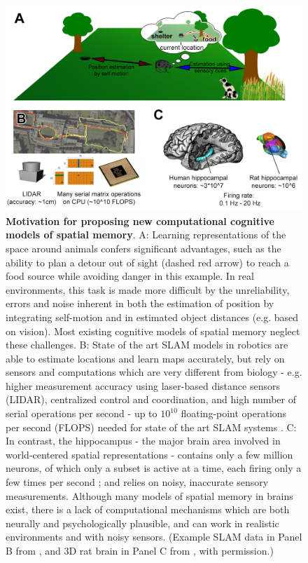 \begin{figure}[h]
	\centering
	\includegraphics[width=\textwidth]{img/motivation}
	\caption[Motivation for proposing new computational cognitive models of spatial memory]{\textbf{Motivation for proposing new computational cognitive models of spatial memory}. A: Learning representations of the space around animals confers significant advantages, such as the ability to plan a detour out of sight (dashed red arrow) to reach a food source while avoiding danger in this example. In real environments, this task is made more difficult by the unreliability, errors and noise inherent in both the estimation of position by integrating self-motion and in estimated object distances (e.g. based on vision). Most existing cognitive models of spatial memory neglect these challenges. B: State of the art SLAM models in robotics are able to estimate locations and learn maps accurately, but rely on sensors and computations which are very different from biology - e.g. higher measurement accuracy using laser-based distance sensors (LIDAR), centralized control and coordination, and high number of serial operations per second - up to $10^{10}$ floating-point operations per second (FLOPS) needed for state of the art SLAM systems \citep{machado2013evaluation}. C: In contrast, the hippocampus - the major brain area involved in world-centered spatial representations - contains only a few million neurons, of which only a subset is active at a time, each firing only a few times per second \citep{rapp1996preserved,vsimic1997volume}; and relies on noisy, inaccurate sensory measurements. Although many models of spatial memory in brains exist, there is a lack of computational mechanisms which are both neurally and psychologically plausible, and can work in realistic environments and with noisy sensors. (Example SLAM data in Panel B from \citep{newman2011describing}, and 3D rat brain in Panel C from \citep{calabrese2013ontology}, with permission.)} 
	\label{fig:motivation}
\end{figure}

